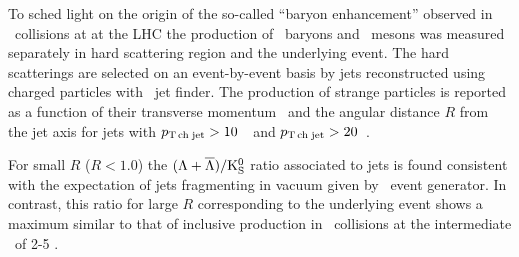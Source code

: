 
To sched light on the origin of the so-called ``baryon enhancement'' observed in \pPb\ collisions at  at the LHC the production of \lda\ baryons and \ks\ mesons was measured separately in hard scattering region and the underlying event.
The hard scatterings are selected on an event-by-event basis by jets reconstructed using charged particles with \akT\ jet finder. 
The production of strange particles is reported as a function of their transverse momentum \pt\ and the angular distance $R$ from the jet axis for jets with $p_\mathrm{T\,ch\;jet} > 10$~\gevc\ and $p_\mathrm{T\,ch\;jet} > 20$~\gevc.


For small $R$ ($R < 1.0$) the $(\Lambda+\overline{\Lambda})/\rm{K}^{0}_{\rm S}$ ratio associated to jets is found consistent with the expectation of jets fragmenting in vacuum given by \pythia\ event generator. 
In contrast, this ratio for large $R$ corresponding to the underlying event shows a maximum similar to that of inclusive production in \pPb\ collisions at the intermediate \pt\ of 2-5 \gevc. 




